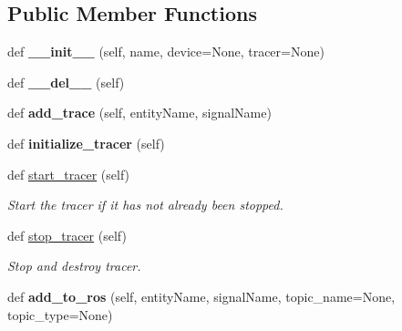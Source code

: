 \subsection*{Public Member Functions}
\begin{DoxyCompactItemize}
\item 
\mbox{\label{classrobot_1_1Robot_ad15eeb92007e66802fabd5ce42add7b0}} 
def {\bfseries \+\_\+\+\_\+init\+\_\+\+\_\+} (self, name, device=None, tracer=None)
\item 
\mbox{\label{classrobot_1_1Robot_a01b3eaee0bfc2251d32aceb7defb858b}} 
def {\bfseries \+\_\+\+\_\+del\+\_\+\+\_\+} (self)
\item 
\mbox{\label{classrobot_1_1Robot_afe20b6b2c337dd9e0b4a53ed30c1a0cc}} 
def {\bfseries add\+\_\+trace} (self, entity\+Name, signal\+Name)
\item 
\mbox{\label{classrobot_1_1Robot_a1d39e4c3dd75c6c7592eeafe6596b773}} 
def {\bfseries initialize\+\_\+tracer} (self)
\item 
\mbox{\label{classrobot_1_1Robot_a3efb51e990f1e3292f321858e9a9723f}} 
def \hyperlink{classrobot_1_1Robot_a3efb51e990f1e3292f321858e9a9723f}{start\+\_\+tracer} (self)
\begin{DoxyCompactList}\small\item\em Start the tracer if it has not already been stopped. \end{DoxyCompactList}\item 
\mbox{\label{classrobot_1_1Robot_ace42b97e31dcc38be3bd69b2ab33a214}} 
def \hyperlink{classrobot_1_1Robot_ace42b97e31dcc38be3bd69b2ab33a214}{stop\+\_\+tracer} (self)
\begin{DoxyCompactList}\small\item\em Stop and destroy tracer. \end{DoxyCompactList}\item 
\mbox{\label{classrobot_1_1Robot_ac208f7eafdff6ad891e77402167e9ccc}} 
def {\bfseries add\+\_\+to\+\_\+ros} (self, entity\+Name, signal\+Name, topic\+\_\+name=None, topic\+\_\+type=None)
\item 
\mbox{\label{classrobot_1_1Robot_a6c8b057c894e762bb43ceb7ec3e7db35}} 

\end{DoxyCompactItemize}
